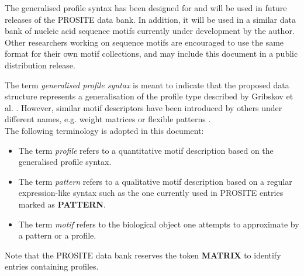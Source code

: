 \documentclass[a4paper,10pt,twoside]{scrartcl}
\begin{document}
  The generalised profile syntax has been designed for and will be used in future releases of the PROSITE data bank. In addition, it will be used in
  a similar data bank of nucleic acid sequence motifs currently under development by the author. Other researchers working on sequence motifs
  are encouraged to use the same format for their own motif collections, and may include this document in a public distribution release.

  The term \emph{generalised profile syntax} is meant to indicate that the proposed data structure represents a generalisation of the profile type
  described by Gribskov et al. \cite{Gribskov90}. However, similar motif descriptors have been introduced by others under different names, e.g. weight matrices \cite{Staden90}
  or flexible patterns \cite{Barton90}.\\
  The following terminology is adopted in this document:
 \begin{itemize}
  \item The term \emph{profile} refers to a quantitative motif description based on the generalised profile syntax.
  \item The term \emph{pattern} refers to a qualitative motif description based on a regular expression-like syntax such as the one currently used in 
	PROSITE entries marked as \textbf{PATTERN}.
  \item The term \emph{motif} refers to the biological object one attempts to approximate by a pattern or a profile.
 \end{itemize}
  Note that the PROSITE data bank reserves the token \textbf{MATRIX} to identify entries containing profiles.
  
\end{document}
